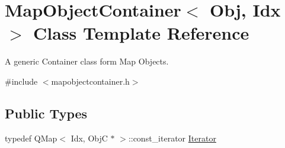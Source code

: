 \hypertarget{class_map_object_container}{}\section{Map\+Object\+Container$<$ Obj, Idx $>$ Class Template Reference}
\label{class_map_object_container}


A generic Container class form Map Objects.  




{\ttfamily \#include $<$mapobjectcontainer.\+h$>$}

\subsection*{Public Types}
\begin{DoxyCompactItemize}
\item 
typedef Q\+Map$<$ Idx, ObjC $\ast$ $>$\+::const\+\_\+iterator \mbox{\hyperlink{class_map_object_container_a744f6940937741a8ffd125e146dc86ab}{Iterator}}
\end{DoxyCompactItemize}
